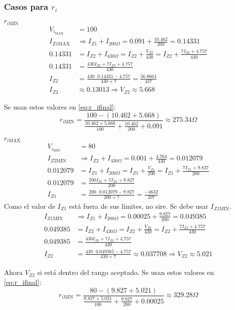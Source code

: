 \subsubsection{Casos para $r_i$}

$r_{i\mathrm{MIN}}$
\begin{align*}
  V_{i_{\mathrm{MAX}}} &= 100 \\
  I_{Z1{\mathrm{MAX}}} &\Rightarrow I_{Z1} + I_{200\Omega} = 0.091 + \frac{10.462}{200} = 0.14331 \\
  0.14331 &= I_{Z2} + I_{430\Omega} = I_{Z2} + \frac{V_{Z2}}{430} = I_{Z2} + \frac{7 I_{Z2} + 4.757}{430} \\
  0.14331 &= \frac{430I_{Z2} + 7 I_{Z2} + 4.757}{430} \\
  I_{Z2} &= \frac{430 \cdot 0.14331 - 4.757}{430 + 7} = \frac{56.8663}{437} \\
  I_{Z2} &\approx 0.13013 \Rightarrow V_{Z2} \approx 5.668
\end{align*}


Se usan estos valores en \ref{eq:r_ifinal}:\\
\begin{equation*}
  r_{i\mathrm{MIN}} = \frac{100 - (10.462 + 5.668)}{\frac{10.462 + 5.668}{100} + \frac{10.462}{200} + 0.091}
  \approx 275.34\Omega
\end{equation*}

\bigskip

$r_{i\mathrm{MAX}}$\\
\begin{align*}
  V_{i_{\mathrm{MIN}}} &= 80 \\
  I_{Z2{\mathrm{MIN}}} &\Rightarrow I_{Z2} + I_{430\Omega} = 0.001 + \frac{4.764}{430} = 0.012079 \\
  0.012079 &= I_{Z1} + I_{200\Omega} = I_{Z1} + \frac{V_{Z1}}{200} = I_{Z1} + \frac{7 I_{Z1} + 9.827}{200} \\
  0.012079 &= \frac{200I_{Z1} + 7 I_{Z1} + 9.827}{200} \\
  I_{Z1} &= \frac{200 \cdot 0.012079 - 9.827}{200 + 7} = \frac{-4632}{207}
\end{align*}
Como el valor de $I_{Z1}$ está fuera de sus límites, no sire. Se debe usar $I_{Z1{\mathrm{MIN}}}$.
\begin{align*}
  I_{Z1{\mathrm{MIN}}} &\Rightarrow I_{Z1} + I_{200\Omega} = 0.00025 + \frac{9.827}{200} = 0.049385 \\
  0.049385 &= I_{Z2} + I_{430\Omega} = I_{Z2} + \frac{V_{Z2}}{430} = I_{Z2} + \frac{7 I_{Z2} + 4.757}{430} \\
  0.049385 &= \frac{430I_{Z2} + 7 I_{Z2} + 4.757}{430} \\
  I_{Z2} &= \frac{430 \cdot 0.049385 - 4.757}{430 + 7} \approx 0.037708 \Rightarrow V_{Z2} \approx 5.021
\end{align*}


Ahora $V_{Z2}$ si está dentro del rango aceptado. Se usan estos valores en \ref{eq:r_ifinal}:\\
\begin{equation*}
  r_{i\mathrm{MIN}} = \frac{80 - (9.827 + 5.021)}{\frac{9.827 + 5.021}{100} + \frac{9.827}{200} + 0.00025}
  \approx 329.28\Omega
\end{equation*}
